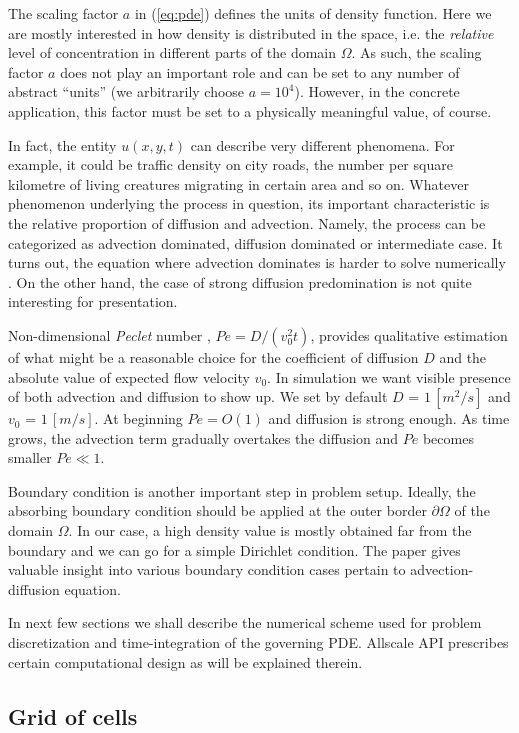\documentclass[acmsmall,review,anonymous]{acmart}\settopmatter{printfolios=true,printccs=false,printacmref=false}
\begin{document}
The scaling factor $a$ in (\ref{eq:pde}) defines the units of density function. Here we are mostly interested in how density is distributed in the space, i.e. the \textit{relative} level of concentration in different parts of the domain $\Omega$. As such, the scaling factor $a$ does not play an important role and can be set to any number of abstract ``units'' (we arbitrarily choose $a = 10^4$). However, in the concrete application, this factor must be set to a physically meaningful value, of course.

In fact, the entity $u(x,y,t)$ can describe very different phenomena. For example, it could be traffic density on city roads, the number per square kilometre of living creatures migrating in certain area and so on. Whatever phenomenon underlying the process in question, its important characteristic is the relative proportion of diffusion and advection. Namely, the process can be categorized as advection dominated, diffusion dominated or intermediate case. It turns out, the equation where advection dominates is harder to solve numerically \cite{Langtangen16}. On the other hand, the case of strong diffusion predomination is not quite interesting for presentation.

Non-dimensional \textit{Peclet} number \cite{Socolofsky05}, $Pe = D/(v_0^2 t)$, provides qualitative estimation of what might be a reasonable choice for the coefficient of diffusion $D$ and the absolute value of expected flow velocity $v_0$. In simulation we want visible presence of both advection and diffusion to show up. We set by default $D$ = $1\,[m^2/s]$ and $v_0$ = $1\,[m/s]$. At beginning $Pe = O(1)$ and diffusion is strong enough. As time grows, the advection term gradually overtakes the diffusion and $Pe$ becomes smaller $Pe \ll 1$.

Boundary condition is another important step in problem setup. Ideally, the absorbing boundary condition should be applied at the outer border $\partial\Omega$ of the domain $\Omega$. In our case, a high density value is mostly obtained far from the boundary and we can go for a simple Dirichlet condition. The paper \cite{Miyaoka17} gives valuable insight into various boundary condition cases pertain to advection-diffusion equation.

In next few sections we shall describe the numerical scheme used for problem discretization and time-integration of the governing PDE. Allscale API prescribes certain computational design as will be explained therein. 

\subsection{Grid of cells}
\end{document}
